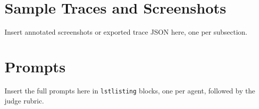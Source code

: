 \documentclass[12pt,a4paper,oneside]{report}
\newif\ifguidance
\newcommand{\guide}[1]{%
  \ifguidance
  \begin{tcolorbox}[enhanced,breakable,colback=guidebg,colframe=bmsblue,
    boxrule=0.6pt,arc=2pt,left=6pt,right=6pt,top=4pt,bottom=4pt,
    fonttitle=\bfseries\small,title={What to write here},
    before upper={\small\setstretch{1.1}}]
  #1
  \end{tcolorbox}
  \fi}
\newenvironment{sample}
  {\par\noindent{\footnotesize\bfseries\textcolor{BrickRed}{[SAMPLE --- replace with your own content]}}\par\color{samplecol}}
  {\par\medskip}
\begin{document}
\chapter{Sample Traces and Screenshots}
\guide{Two or three complete annotated traces: one successful run, one run with a correction, and one
abstention or failure.}
\begin{sample}
Insert annotated screenshots or exported trace JSON here, one per subsection.
\end{sample}


\chapter{Prompts}
\guide{The full system prompt of each agent and the LLM-judge rubric.}
\begin{sample}
Insert the full prompts here in \texttt{lstlisting} blocks, one per agent, followed by the judge rubric.
\end{sample}
\end{document}
